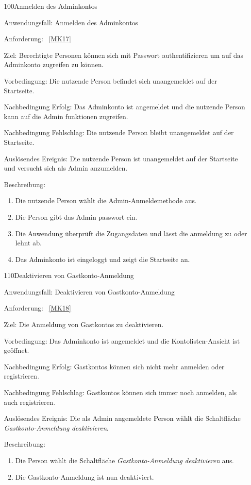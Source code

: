 \begin{function}{100}{Anmelden des Adminkontos}
    \item[Anwendungsfall:] Anmelden des Adminkontos
    \item[Anforderung:]~\ref{MK17}
    \item[Ziel:] Berechtigte Personen können sich mit Passwort authentifizieren um auf das Adminkonto zugreifen zu können.
    \item[Vorbedingung:] Die nutzende Person befindet sich unangemeldet auf der Startseite.
    \item[Nachbedingung Erfolg:] Das Adminkonto ist angemeldet und die nutzende Person kann auf die Admin funktionen zugreifen.
    \item[Nachbedingung Fehlschlag:] Die nutzende Person bleibt unangemeldet auf der Startseite.
    \item[Auslösendes Ereignis:] Die nutzende Person ist unangemeldet auf der Startseite und versucht sich als Admin anzumelden.
    \item[Beschreibung:] ~
    \begin{enumerate}
        \item Die nutzende Person wählt die Admin-Anmeldemethode aus.
        \item Die Person gibt das Admin passwort ein.
        \item Die Anwendung überprüft die Zugangsdaten und lässt die anmeldung zu oder lehnt ab.
        \item Das Adminkonto ist eingeloggt und zeigt die Startseite an.
    \end{enumerate}
\end{function}

\pagebreak

\begin{function}{110}{Deaktivieren von Gastkonto-Anmeldung}
    \item[Anwendungsfall:] Deaktivieren von Gastkonto-Anmeldung
    \item[Anforderung:]~\ref{MK18}
    \item[Ziel:] Die Anmeldung von Gastkontos zu deaktivieren.
    \item[Vorbedingung:] Das Adminkonto ist angemeldet und die Kontolisten-Ansicht ist geöffnet.
    \item[Nachbedingung Erfolg:] Gastkontos können sich nicht mehr anmelden oder registrieren.
    \item[Nachbedingung Fehlschlag:] Gastkontos können sich immer noch anmelden, als auch registrieren.
    \item[Auslösendes Ereignis:] Die als Admin angemeldete Person wählt die Schaltfläche \textit{Gastkonto-Anmeldung deaktivieren}.
    \item[Beschreibung:] ~
    \begin{enumerate}
        \item Die Person wählt die Schaltfläche \textit{Gastkonto-Anmeldung deaktivieren} aus.
        \item Die Gastkonto-Anmeldung ist nun deaktiviert.
    \end{enumerate}
\end{function}

